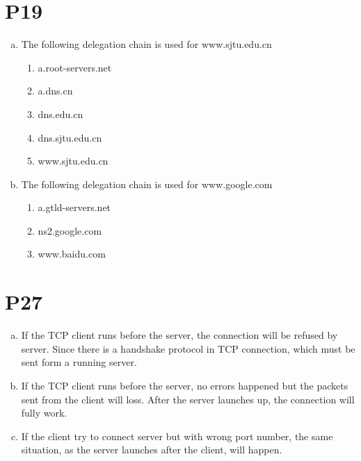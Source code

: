\documentclass[a4paper, 11pt]{article}
\begin{document}
\section*{P19}
	\begin{enumerate}[a.]
		\item The following delegation chain is used for www.sjtu.edu.cn
			\begin{enumerate}[1)]
				\item a.root-servers.net
				\item a.dns.cn
				\item dns.edu.cn
				\item dns.sjtu.edu.cn
				\item www.sjtu.edu.cn
			\end{enumerate}
		\item The following delegation chain is used for www.google.com
			\begin{enumerate}[1)]
				\item a.gtld-servers.net
				\item ns2.google.com
				\item www.baidu.com
			\end{enumerate}
	\end{enumerate}
\section*{P27}
	\begin{enumerate}[a.]
		\item If the TCP client runs before the server, the connection will be refused by server. Since there is a handshake protocol in TCP connection, which must be sent form a running server.
		\item If the TCP client runs before the server, no errors happened but the packets sent from the client will loss. After the server launches up, the connection will fully work.
		\item If the client try to connect server but with wrong port number, the same situation, as the server launches after the client, will happen.
	\end{enumerate}
\end{document}
